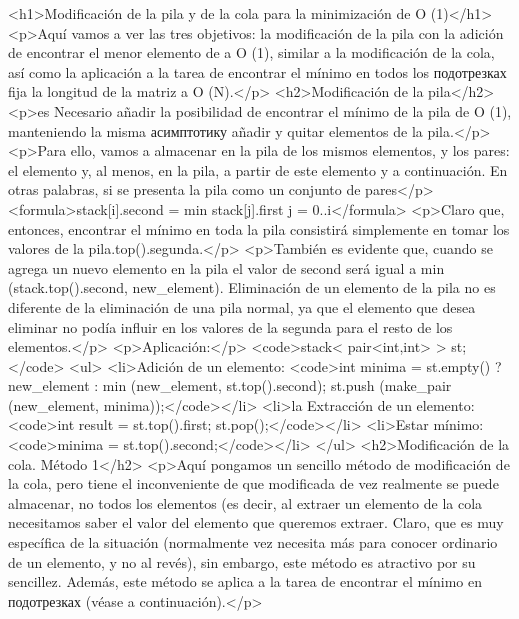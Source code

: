 <h1>Modificación de la pila y de la cola para la minimización de O (1)</h1>
<p>Aquí vamos a ver las tres objetivos: la modificación de la pila con la adición de encontrar el menor elemento de a O (1), similar a la modificación de la cola, así como la aplicación a la tarea de encontrar el mínimo en todos los подотрезках fija la longitud de la matriz a O (N).</p>
<h2>Modificación de la pila</h2>
<p>es Necesario añadir la posibilidad de encontrar el mínimo de la pila de O (1), manteniendo la misma асимптотику añadir y quitar elementos de la pila.</p>
<p>Para ello, vamos a almacenar en la pila de los mismos elementos, y los pares: el elemento y, al menos, en la pila, a partir de este elemento y a continuación. En otras palabras, si se presenta la pila como un conjunto de pares</p>
<formula>stack[i].second = min { stack[j].first }
j = 0..i</formula>
<p>Claro que, entonces, encontrar el mínimo en toda la pila consistirá simplemente en tomar los valores de la pila.top().segunda.</p>
<p>También es evidente que, cuando se agrega un nuevo elemento en la pila el valor de second será igual a min (stack.top().second, new_element). Eliminación de un elemento de la pila no es diferente de la eliminación de una pila normal, ya que el elemento que desea eliminar no podía influir en los valores de la segunda para el resto de los elementos.</p>
<p>Aplicación:</p>
<code>stack< pair<int,int> > st;</code>
<ul>
<li>Adición de un elemento:
<code>int minima = st.empty() ? new_element : min (new_element, st.top().second);
st.push (make_pair (new_element, minima));</code></li>
<li>la Extracción de un elemento:
<code>int result = st.top().first;
st.pop();</code></li>
<li>Estar mínimo:
<code>minima = st.top().second;</code></li>
</ul>
<h2>Modificación de la cola. Método 1</h2>
<p>Aquí pongamos un sencillo método de modificación de la cola, pero tiene el inconveniente de que modificada de vez realmente se puede almacenar, no todos los elementos (es decir, al extraer un elemento de la cola necesitamos saber el valor del elemento que queremos extraer. Claro, que es muy específica de la situación (normalmente vez necesita más para conocer ordinario de un elemento, y no al revés), sin embargo, este método es atractivo por su sencillez. Además, este método se aplica a la tarea de encontrar el mínimo en подотрезках (véase a continuación).</p>
